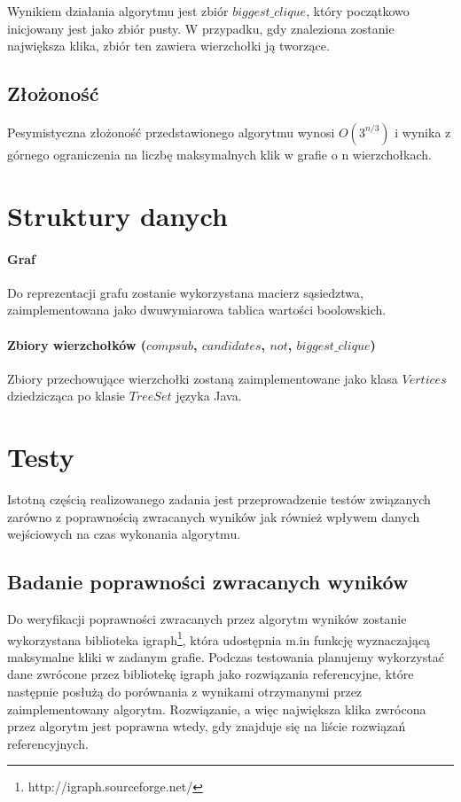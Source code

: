 \documentclass[12pt, a4paper]{article}
\begin{document}
Wynikiem działania algorytmu jest zbiór $biggest\_clique$, który początkowo inicjowany jest jako zbiór pusty. W przypadku, gdy znaleziona zostanie największa klika, zbiór ten zawiera wierzchołki ją tworzące.

\subsection{Złożoność}
Pesymistyczna złożoność przedstawionego algorytmu wynosi $O(3^{n/3})$ i wynika z górnego ograniczenia na liczbę maksymalnych klik w grafie o n wierzchołkach.

\section{Struktury danych}
\paragraph{Graf}
Do reprezentacji grafu zostanie wykorzystana macierz sąsiedztwa, zaimplementowana jako dwuwymiarowa tablica wartości boolowskich.

\paragraph{Zbiory wierzchołków ($compsub$, $candidates$, $not$, $biggest\_clique$)}
Zbiory przechowujące wierzchołki zostaną zaimplementowane jako klasa $Vertices$ dziedzicząca po klasie $TreeSet$ języka Java.

\section{Testy}
Istotną częścią realizowanego zadania jest przeprowadzenie testów związanych zarówno z poprawnością zwracanych wyników jak również wpływem danych wejściowych na czas wykonania algorytmu.

\subsection{Badanie poprawności zwracanych wyników}
Do weryfikacji poprawności zwracanych przez algorytm wyników zostanie wykorzystana biblioteka igraph\footnote{http://igraph.sourceforge.net/}, która udostępnia m.in funkcję wyznaczającą maksymalne kliki w zadanym grafie. Podczas testowania planujemy wykorzystać dane zwrócone przez bibliotekę igraph jako rozwiązania referencyjne, które następnie posłużą do porównania z wynikami otrzymanymi przez zaimplementowany algorytm. Rozwiązanie, a więc największa klika zwrócona przez algorytm jest poprawna wtedy, gdy znajduje się na liście rozwiązań referencyjnych.
\end{document}

